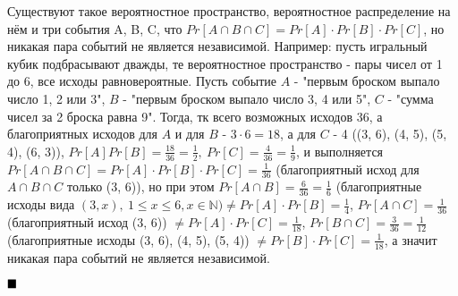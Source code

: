 \documentclass[a4paper, 16pt]{article}
\newcommand{\N} {\mathbb{N}}
\newenvironment{proof}[1][Доказательство]{%
	\begin{trivlist}
		\item[\hskip \labelsep {\bfseries #1:}]
		\item \hspace{14pt}
	}{
		$ \hfill\blacksquare $
	\end{trivlist}
	\hfill\break
}
\begin{document}
		\begin{proof}
			Существуют такое вероятностное пространство, вероятностное распределение на нём
			и три события A, B, C, что
			$Pr[A \cap B \cap C] = Pr[A] \cdot Pr[B] \cdot Pr[C]$,
			но никакая пара событий не является независимой. Например: пусть игральный кубик подбрасывают дважды, те вероятностное пространство - пары чисел от 1 до 6, все исходы равновероятные. Пусть событие $A$ - "первым броском выпало число 1, 2 или 3", $B$ - "первым броском выпало число 3, 4 или 5", $C$ - "сумма чисел за 2 броска равна 9". Тогда, тк всего возможных исходов 36, а благоприятных исходов для $A$ и для $B$ - $3 \cdot 6 = 18$, а для $C$ - 4 ((3, 6), (4, 5), (5, 4), (6, 3)), $Pr[A] Pr[B]= \frac{18}{36} = \frac{1}{2}, \ Pr[C] = \frac{4}{36} = \frac{1}{9}$, и выполняется $Pr[A \cap B \cap C] = Pr[A] \cdot Pr[B] \cdot Pr[C] = \frac{1}{36}$ (благоприятный исход для $A \cap B \cap C$ только (3, 6)), но при этом $Pr[A \cap B] = \frac{6}{36} = \frac{1}{6}$ (благоприятные исходы вида $(3, x), \ 1 \leq x \leq 6, x \in \N ) \ne Pr[A] \cdot Pr[B] = \frac{1}{4}$, $Pr[A \cap C] = \frac{1}{36}$ (благоприятный исход (3, 6)) $\ne Pr[A] \cdot Pr[C] = \frac{1}{18}$, $Pr[B \cap C] = \frac{3}{36} = \frac{1}{12}$ (благоприятные исходы (3, 6), (4, 5), (5, 4)) $\ne Pr[B] \cdot Pr[C] = \frac{1}{18}$, а значит никакая пара событий не является независимой.
		\end{proof}
	
	
	
	
	
	
	
	
	
	
	
	
	
\end{document}
